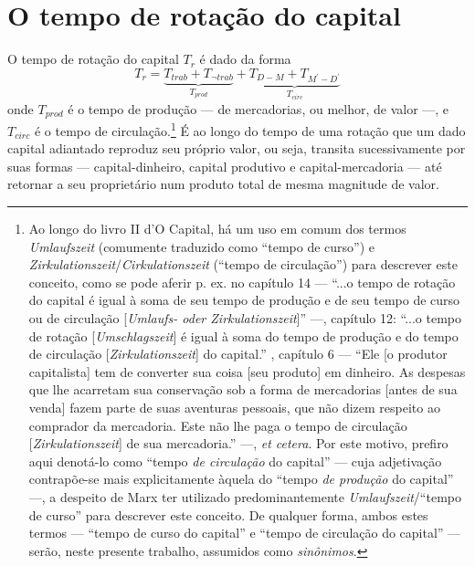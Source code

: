 \documentclass[12pt]{article}
\numberwithin{equation}{section}
\theoremstyle{plain}
\theoremstyle{definition}
\theoremstyle{remark}
\begin{document}
\section{O tempo de rotação do capital}
O tempo de rotação do capital $T_{r}$ é dado da forma
$$
T_{r} = \underbrace{ T_{trab} + T_{\lnot trab} }_{ T_{prod} } + \underbrace{ T_{D-M} + T_{M^\prime-D^\prime} }_{ T_{circ} }
$$
onde $T_{prod}$ é o tempo de produção — de mercadorias, ou melhor, de valor —, e $T_{circ}$ é o tempo de circulação.\footnote{Ao longo do livro II d'O Capital, há um uso em comum dos termos \textit{Umlaufszeit} (comumente traduzido como ``tempo de curso'') e \textit{Zirkulationszeit}/\textit{Cirkulationszeit} (``tempo de circulação'') para descrever este conceito, como se pode aferir p. ex. no capítulo 14 — ``...o tempo de rotação do capital é igual à soma de seu tempo de produção e de seu tempo de curso ou de circulação [\textit{Umlaufs- oder Zirkulationszeit}]'' \parencite[p. 343]{Marx2014} —, capítulo 12: ``...o tempo de rotação [\textit{Umschlagszeit}] é igual à soma do tempo de produção e do tempo de circulação [\textit{Zirkulationszeit}] do capital.'' \parencite[p. 323]{Marx2014}, capítulo 6 — ``Ele [o produtor capitalista] tem de converter sua coisa [seu produto] em dinheiro. As despesas que lhe acarretam sua conservação sob a forma de mercadorias [antes de sua venda] fazem parte de suas aventuras pessoais, que não dizem respeito ao comprador da mercadoria. Este não lhe paga o tempo de circulação [\textit{Zirkulationszeit}] de sua mercadoria.'' \parencite[p. 225]{Marx2014} —, \textit{et cetera}. Por este motivo, prefiro aqui denotá-lo como ``tempo \textit{de circulação} do capital'' — cuja adjetivação contrapõe-se mais explicitamente àquela do ``tempo \textit{de produção} do capital'' —, a despeito de Marx ter utilizado predominantemente \textit{Umlaufszeit}/``tempo de curso'' para descrever este conceito. De qualquer forma, ambos estes termos — ``tempo de curso do capital'' e ``tempo de circulação do capital'' — serão, neste presente trabalho, assumidos como \textit{sinônimos}. } É ao longo do tempo de uma rotação que um dado capital adiantado reproduz seu próprio valor, ou seja, transita sucessivamente por suas formas — capital-dinheiro, capital produtivo e capital-mercadoria — até retornar a seu proprietário num produto total de mesma magnitude de valor. 
\end{document}
